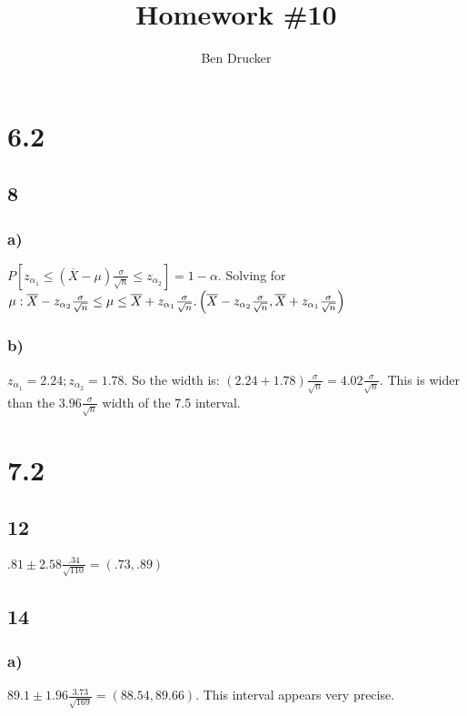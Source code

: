 \documentclass{article}
\newcommand{\hwkNum}{10}
\newcommand{\hwkAuthors}{Ben Drucker}
\begin{document}
\title{Homework \#\hwkNum}
\author{\hwkAuthors}
\date{}

\maketitle


\section*{6.2}
	\subsection*{8}
		\subsubsection*{a)}
			$P \left [ z_{\alpha_1} \leq (\overline{X} - \mu) \frac{\sigma}{\sqrt{n}} \leq z_{\alpha_2} \right ] = 1-\alpha.$ Solving for $\mu: \overline{X} - z_{\alpha_2}  \frac{\sigma}{\sqrt{n}} \leq \mu \leq \overline{X} + z_{\alpha_1} \frac{\sigma}{\sqrt{n}}.\\
			\left ( \overline{X} - z_{\alpha_2} \frac{\sigma}{\sqrt{n}} ,  \overline{X} + z_{\alpha_1}  \frac{\sigma}{\sqrt{n}} \right )$
		\subsubsection*{b)}
			$z_{\alpha_1} = 2.24; 
				z_{\alpha_2} = 1.78. $ So the width is: $(2.24+1.78) \frac{\sigma}{\sqrt{n}} = 4.02 \frac{\sigma}{\sqrt{n}}.$ This is wider than the $3.96\frac{\sigma}{\sqrt{n}}$ width of the 7.5 interval. 
\section*{7.2}
	\subsection*{12}
		$.81 \pm 2.58 \frac{.34}{\sqrt{110}} = (.73, .89)$
	\subsection*{14}
		\subsubsection*{a)}
			$89.1 \pm 1.96 \frac{3.73}{\sqrt{169}} = (88.54, 89.66).$ This interval appears very precise. 
\end{document}
